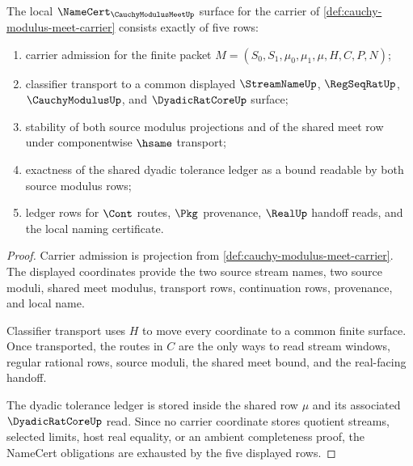 \begin{theorem}\label{thm:cauchy-modulus-meet-namecert-obligations}
The local $\NameCert_{\CauchyModulusMeetUp}$ surface for the carrier of \autoref{def:cauchy-modulus-meet-carrier} consists exactly of five rows:
\begin{enumerate}
\item carrier admission for the finite packet $M=(S_0,S_1,\mu_0,\mu_1,\mu,H,C,P,N)$;
\item classifier transport to a common displayed $\StreamNameUp$, $\RegSeqRatUp$, $\CauchyModulusUp$, and $\DyadicRatCoreUp$ surface;
\item stability of both source modulus projections and of the shared meet row under componentwise $\hsame$ transport;
\item exactness of the shared dyadic tolerance ledger as a bound readable by both source modulus rows;
\item ledger rows for $\Cont$ routes, $\Pkg$ provenance, $\RealUp$ handoff reads, and the local naming certificate.
\end{enumerate}
\end{theorem}
\begin{proof}
Carrier admission is projection from \autoref{def:cauchy-modulus-meet-carrier}. The displayed coordinates provide the two source stream names, two source moduli, shared meet modulus, transport rows, continuation rows, provenance, and local name.

Classifier transport uses $H$ to move every coordinate to a common finite surface. Once transported, the routes in $C$ are the only ways to read stream windows, regular rational rows, source moduli, the shared meet bound, and the real-facing handoff.

The dyadic tolerance ledger is stored inside the shared row $\mu$ and its associated $\DyadicRatCoreUp$ read. Since no carrier coordinate stores quotient streams, selected limits, host real equality, or an ambient completeness proof, the NameCert obligations are exhausted by the five displayed rows.
\end{proof}

